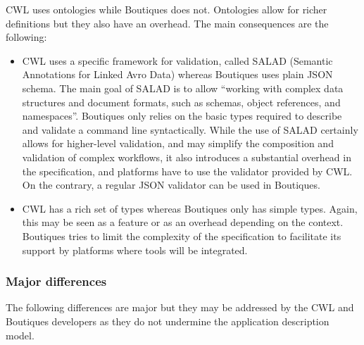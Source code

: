 \documentclass{article}
\newcommand{\boutiques}{Boutiques\xspace}
\begin{document}
CWL uses ontologies while \boutiques does not. Ontologies allow for
richer definitions but they also have an overhead. The main
consequences are the following:
\begin{itemize}
\item CWL uses a specific framework for
validation, called SALAD (Semantic Annotations for Linked Avro Data)
whereas \boutiques uses plain JSON schema. The main goal of SALAD is to
allow ``working with complex data structures and document formats, such
as schemas, object references, and namespaces''. \boutiques only relies
on the basic types required to describe and validate a command line
syntactically. While the use of SALAD certainly allows for
higher-level validation, and may simplify the composition and
validation of complex workflows, it also introduces a substantial
overhead in the specification, and platforms have to use the validator
provided by CWL. On the contrary, a regular JSON validator can be used in \boutiques.
\item  CWL has a rich set of types whereas \boutiques only has simple
types. Again, this may be seen as a feature or as an overhead
depending on the context. \boutiques tries to limit the complexity of
the specification to facilitate its support by platforms where tools
will be integrated.
\end{itemize}

\subsubsection{Major differences}

The following differences are major but they may be addressed by the
CWL and \boutiques developers as they do not undermine the application
description model.
\end{document}
